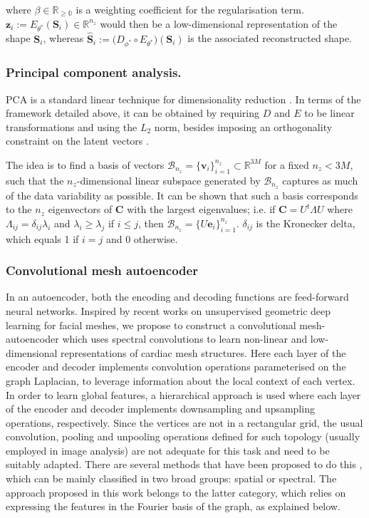 \noindent where $\beta\in\mathbb{R_{\geq 0}}$ is a weighting coefficient for the regularisation term. $\textbf{z}_i:= E_{\theta^*}  (\textbf{S}_i)\in\mathbb{R}^{n_z}$ would then be a low-dimensional representation of the shape $\textbf{S}_i$, whereas $\hat{\textbf{S}}_i:=\big(D_{\phi^*} \circ E_{\theta^*}\big)(\textbf{S}_i)$ is the associated reconstructed shape.

\subsubsection{Principal component analysis.}
PCA is a standard linear technique for dimensionality reduction \cite{pearson_pca}. In terms of the framework detailed above, it can be obtained by requiring $D$ and $E$ to be linear transformations and using the $L_2$ norm, besides imposing an orthogonality constraint on the latent vectors \cite{goodfellow-et-al-2016}.

The idea is to find a basis of vectors  $\mathcal{B}_{n_z}=\{\textbf{v}_i\}_{i=1}^{n_z}\subset\mathbb{R}^{3M}$
for a fixed $n_z < 3M$, such that the $n_z$-dimensional linear subspace generated by $\mathcal{B}_{n_z}$ captures as much of the data variability as possible. It can be shown that such a basis corresponds to the $n_z$ eigenvectors of  $\textbf{C}$ with the largest eigenvalues; i.e. if $\textbf{C}=U^{t}\Lambda U$ where $\Lambda_{ij}=\delta_{ij}\lambda_i$ and $\lambda_i \geq \lambda_j$ if $i\leq j$, then $\mathcal{B}_{n_z}=\{{U\textbf{e}_i}\}_{i=1}^{n_z}$.
$\delta_{ij}$ is the Kronecker delta, which equals 1 if $i=j$ and 0 otherwise.

\subsubsection{Convolutional mesh autoencoder}
In an autoencoder, both the encoding and decoding functions are feed-forward neural networks.
Inspired by recent works on unsupervised geometric deep learning \cite{ref_coma} for facial meshes, we propose to construct a convolutional mesh-autoencoder which uses spectral convolutions \cite{ref_spectral_graph_conv} to learn non-linear and low-dimensional representations of cardiac mesh structures. Here each layer of the encoder and decoder implements convolution operations parameterised on the graph Laplacian, to leverage information about the local context of each vertex. In order to learn global features, a hierarchical approach is used where each layer of the encoder and decoder implements downsampling and upsampling operations, respectively. 
Since the vertices are not in a rectangular grid, the usual convolution, pooling and unpooling operations defined for such topology (usually employed in image analysis) are not adequate for this task and need to be suitably adapted. There are several methods that have been proposed to do this \cite{ref_bronstein_geom_DL}, which can be mainly classified in two broad groups: spatial or spectral. The approach proposed in this work belongs to the latter category, which relies on expressing the features in the Fourier basis of the graph, as explained below.

